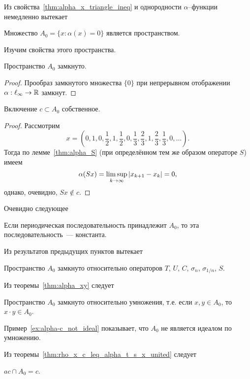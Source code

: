\label{sec:space_A0}

Из свойства~\ref{thm:alpha_x_triangle_ineq} и однородности $\alpha$--функции немедленно вытекает
\begin{theorem}
	\label{thm:A0_is_space}
	Множество $A_0 = \{x: \alpha(x) = 0\}$
	является пространством.
\end{theorem}
Изучим свойства этого пространства.
\begin{property}
	Пространство $A_0$ замкнуто.
\end{property}
\begin{proof}
	Прообраз замкнутого множества $\{0\}$
	при непрерывном отображении $\alpha : \ell_\infty \to \R$
	замкнут.
\end{proof}
\begin{theorem}
	Включение $c \subset A_0$ собственное.
\end{theorem}
\begin{proof}
	Рассмотрим
	\begin{equation}
		x=\left(
			0,1,
			0,\frac{1}{2},1,\frac{1}{2},
			0,\frac{1}{3},\frac{2}{3},1,\frac{2}{3},\frac{1}{3},
			0,
			...
		\right)
		.
	\end{equation}
	Тогда по лемме~\ref{thm:alpha_S} (при определённом тем же образом операторе $S$) имеем
	\begin{equation}
		\alpha(Sx) = \varlimsup_{k\to\infty} |x_{k+1} - x_{k}| = 0
		,
	\end{equation}
	однако, очевидно, $Sx\notin c$.
\end{proof}
Очевидно следующее
\begin{property}
	Если периодическая последовательность принадлежит $A_0$,
	то эта последовательность~--- константа.
\end{property}

Из результатов предыдущих пунктов вытекает
\begin{theorem}
	Пространство $A_0$ замкнуто относительно операторов $T$, $U$, $C$, $\sigma_n$, $\sigma_{1/n}$, $S$.
\end{theorem}

Из теоремы~\ref{thm:alpha_xy} следует
\begin{theorem}
	Пространство $A_0$ замкнуто относительно умножения,
	т.е. если $x,y\in A_0$, то $x\cdot y \in A_0$.
\end{theorem}

Пример~\ref{ex:alpha-c_not_ideal} показывает, что $A_0$
не является идеалом по умножению.

Из теоремы~\ref{thm:rho_x_c_leq_alpha_t_s_x_united} следует
\begin{theorem}
	$ac \cap A_0 = c$.
\end{theorem}

